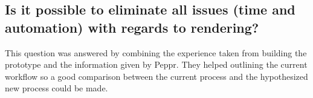 \subsection{Is it possible to eliminate all issues (time and automation) with regards to rendering?}
This question was answered by combining the experience taken from building the prototype and the information given by Peppr. They helped outlining the current workflow so a good comparison between the current process and the hypothesized new process could be made.

